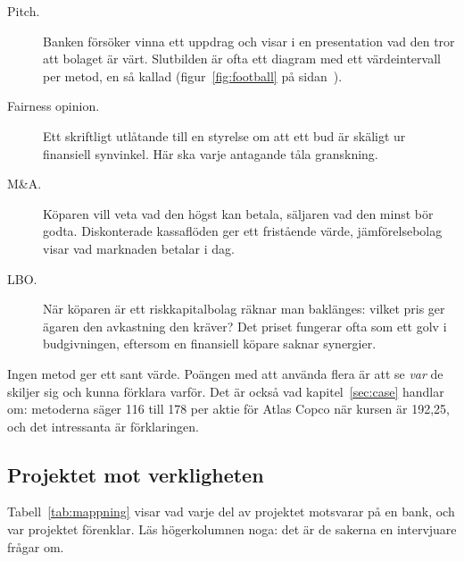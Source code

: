 \begin{description}
  \item[Pitch.] Banken försöker vinna ett uppdrag och visar i en presentation  vad
    den tror att bolaget är värt. Slutbilden är ofta ett diagram med ett värdeintervall per
    metod, en så kallad  (figur~\ref{fig:football} på
    sidan~\pageref{fig:football}).
  \item[Fairness opinion.] Ett skriftligt utlåtande till en styrelse om att ett bud är skäligt ur
    finansiell synvinkel. Här ska varje antagande tåla granskning.
  \item[M\&A.] Köparen vill veta vad den högst kan betala, säljaren vad den minst bör godta.
    Diskonterade kassaflöden ger ett fristående värde, jämförelsebolag visar vad marknaden
    betalar i dag.
  \item[LBO.] När köparen är ett riskkapitalbolag  räknar man baklänges: vilket
    pris ger ägaren den avkastning den kräver? Det priset fungerar ofta som ett golv i
    budgivningen, eftersom en finansiell köpare saknar synergier.
\end{description}

Ingen metod ger ett sant värde. Poängen med att använda flera är att se \emph{var} de skiljer sig
och kunna förklara varför. Det är också vad kapitel~\ref{sec:case} handlar om: metoderna säger
116 till 178\kr{} per aktie för Atlas Copco när kursen är 192,25\kr, och det intressanta är
förklaringen.

\subsection{Projektet mot verkligheten}

Tabell~\ref{tab:mappning} visar vad varje del av projektet motsvarar på en bank, och var
projektet förenklar. Läs högerkolumnen noga: det är de sakerna en intervjuare frågar om.

